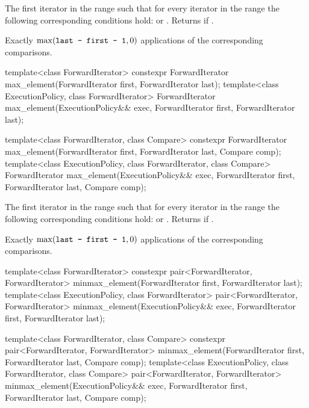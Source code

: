 \begin{itemdescr}
\pnum
\returns
The first iterator
in the range
such that for every iterator
in the range
the following corresponding conditions hold:
or
.
Returns
if
.

\pnum
\complexity
Exactly
$\max(\texttt{last - first - 1}, 0)$
applications of the corresponding comparisons.
\end{itemdescr}

%
\begin{itemdecl}
template<class ForwardIterator>
  constexpr ForwardIterator max_element(ForwardIterator first, ForwardIterator last);
template<class ExecutionPolicy, class ForwardIterator>
  ForwardIterator max_element(ExecutionPolicy&& exec,
                              ForwardIterator first, ForwardIterator last);

template<class ForwardIterator, class Compare>
  constexpr ForwardIterator max_element(ForwardIterator first, ForwardIterator last,
                                        Compare comp);
template<class ExecutionPolicy, class ForwardIterator, class Compare>
  ForwardIterator max_element(ExecutionPolicy&& exec,
                              ForwardIterator first, ForwardIterator last,
                              Compare comp);
\end{itemdecl}

\begin{itemdescr}
\pnum
\returns
The first iterator
in the range
such that for every iterator
in the range
the following corresponding conditions hold:
or
.
Returns
if
.

\pnum
\complexity
Exactly
$\max(\texttt{last - first - 1}, 0)$
applications of the corresponding comparisons.
\end{itemdescr}

%
\begin{itemdecl}
template<class ForwardIterator>
  constexpr pair<ForwardIterator, ForwardIterator>
    minmax_element(ForwardIterator first, ForwardIterator last);
template<class ExecutionPolicy, class ForwardIterator>
  pair<ForwardIterator, ForwardIterator>
    minmax_element(ExecutionPolicy&& exec,
                   ForwardIterator first, ForwardIterator last);

template<class ForwardIterator, class Compare>
  constexpr pair<ForwardIterator, ForwardIterator>
    minmax_element(ForwardIterator first, ForwardIterator last, Compare comp);
template<class ExecutionPolicy, class ForwardIterator, class Compare>
  pair<ForwardIterator, ForwardIterator>
    minmax_element(ExecutionPolicy&& exec,
                   ForwardIterator first, ForwardIterator last, Compare comp);
\end{itemdecl}


